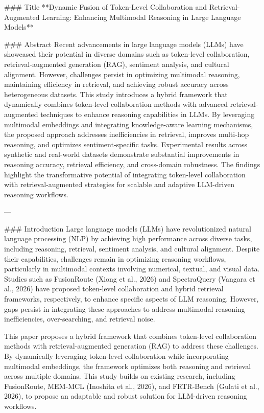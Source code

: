 ### Title  
**Dynamic Fusion of Token-Level Collaboration and Retrieval-Augmented Learning: Enhancing Multimodal Reasoning in Large Language Models**

### Abstract  
Recent advancements in large language models (LLMs) have showcased their potential in diverse domains such as token-level collaboration, retrieval-augmented generation (RAG), sentiment analysis, and cultural alignment. However, challenges persist in optimizing multimodal reasoning, maintaining efficiency in retrieval, and achieving robust accuracy across heterogeneous datasets. This study introduces a hybrid framework that dynamically combines token-level collaboration methods with advanced retrieval-augmented techniques to enhance reasoning capabilities in LLMs. By leveraging multimodal embeddings and integrating knowledge-aware learning mechanisms, the proposed approach addresses inefficiencies in retrieval, improves multi-hop reasoning, and optimizes sentiment-specific tasks. Experimental results across synthetic and real-world datasets demonstrate substantial improvements in reasoning accuracy, retrieval efficiency, and cross-domain robustness. The findings highlight the transformative potential of integrating token-level collaboration with retrieval-augmented strategies for scalable and adaptive LLM-driven reasoning workflows.

---

### Introduction  
Large language models (LLMs) have revolutionized natural language processing (NLP) by achieving high performance across diverse tasks, including reasoning, retrieval, sentiment analysis, and cultural alignment. Despite their capabilities, challenges remain in optimizing reasoning workflows, particularly in multimodal contexts involving numerical, textual, and visual data. Studies such as FusionRoute (Xiong et al., 2026) and SpectraQuery (Vangara et al., 2026) have proposed token-level collaboration and hybrid retrieval frameworks, respectively, to enhance specific aspects of LLM reasoning. However, gaps persist in integrating these approaches to address multimodal reasoning inefficiencies, over-searching, and retrieval noise.

This paper proposes a hybrid framework that combines token-level collaboration methods with retrieval-augmented generation (RAG) to address these challenges. By dynamically leveraging token-level collaboration while incorporating multimodal embeddings, the framework optimizes both reasoning and retrieval across multiple domains. This study builds on existing research, including FusionRoute, MEM-MCL (Inoshita et al., 2026), and FRTR-Bench (Gulati et al., 2026), to propose an adaptable and robust solution for LLM-driven reasoning workflows.


